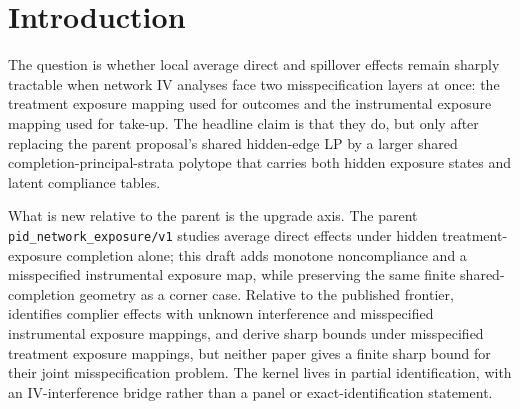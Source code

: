 \documentclass[11pt]{article}
\theoremstyle{definition}
\theoremstyle{plain}
\theoremstyle{remark}
\begin{document}
\begin{abstract}
The parent proposal \texttt{pid\_network\_exposure/v1} gives sharp average direct effect bounds when the treatment exposure mapping may be misspecified but treatment equals assignment. This draft widens the model to randomized encouragement with noncompliance and a second misspecified instrumental exposure mapping. The central object is a shared completion-principal-strata polytope that combines hidden-edge feasibility, latent compliance types, and bounded potential outcomes in one finite program. The routine theorem states that sharp complier direct and spillover identified sets are the projections of that polytope. The flagship conjecture is that the product relaxation over treatment-exposure kernels, instrumental-exposure kernels, and compliance kernels is strictly nonsharp on an open class of finite networks, with a computable gap witnessed on a four-unit design. Resolving that conjecture would connect exposure-robust sensitivity analysis to IV interpretation in settings where hidden edges affect both take-up and outcomes.
\end{abstract}

\section{Introduction}
The question is whether local average direct and spillover effects remain sharply tractable when network IV analyses face two misspecification layers at once: the treatment exposure mapping used for outcomes and the instrumental exposure mapping used for take-up. The headline claim is that they do, but only after replacing the parent proposal's shared hidden-edge LP by a larger shared completion-principal-strata polytope that carries both hidden exposure states and latent compliance tables.

What is new relative to the parent is the upgrade axis. The parent \texttt{pid\_network\_exposure/v1} studies average direct effects under hidden treatment-exposure completion alone; this draft adds monotone noncompliance and a misspecified instrumental exposure map, while preserving the same finite shared-completion geometry as a corner case. Relative to the published frontier, \citet[Abstract]{hoshino_yanagi_2024_noncompliance_unknown_interference} identifies complier effects with unknown interference and misspecified instrumental exposure mappings, and \citet[Abstract]{schroder_oprescu_feuerriegel_kallus_2026_networks_partialid} derive sharp bounds under misspecified treatment exposure mappings, but neither paper gives a finite sharp bound for their joint misspecification problem. The kernel lives in partial identification, with an IV-interference bridge rather than a panel or exact-identification statement.
\end{document}
